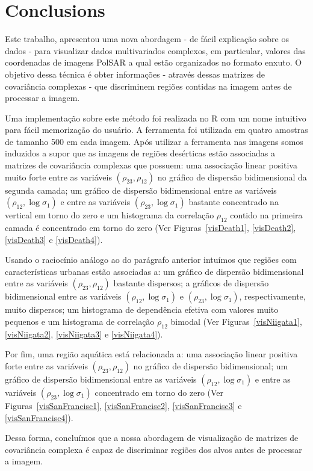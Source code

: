 \documentclass[a4paper,12pt]{article}
\begin{document}

\section{Conclusions}\label{cinco}


Este trabalho, apresentou uma nova abordagem - de fácil explicação sobre os dados - para visualizar dados multivariados complexos, em particular, valores das coordenadas de imagens Pol{SAR} a qual estão organizados no formato enxuto. O objetivo dessa técnica é obter informações - através dessas matrizes de covariância complexas - que discriminem regiões contidas na imagem antes de processar a imagem. 

Uma implementação sobre este método foi realizada no R com um nome intuitivo para fácil memorização do usuário. A ferramenta foi utilizada em quatro amostras de tamanho 500 em cada imagem. Após utilizar a ferramenta nas imagens somos induzidos a supor que as imagens de regiões desérticas estão associadas a matrizes de covariância complexas que possuem: uma associação linear positiva muito forte entre as variáveis $(\rho_{23}, \rho_{12})$ no gráfico de dispersão bidimensional da segunda camada;   um gráfico de dispersão bidimensional entre as variáveis $(\rho_{12},\log\sigma_{1})$ e entre as variáveis $(\rho_{23},\log\sigma_{1})$ bastante concentrado na vertical em torno do zero e um histograma da correlação $\rho_{12}$ contido na primeira camada é concentrado em torno do zero (Ver Figuras~\ref{visDeath1}, \ref{visDeath2}, \ref{visDeath3} e \ref{visDeath4}). 

Usando o raciocínio análogo ao do parágrafo anterior intuímos que regiões com características urbanas estão associadas a: um gráfico de dispersão bidimensional entre as variáveis $(\rho_{23}, \rho_{12})$ bastante dispersos; a gráficos de dispersão bidimensional entre as variáveis $(\rho_{12},\log\sigma_{1})$ e $(\rho_{23},\log\sigma_{1})$, respectivamente, muito dispersos; um histograma de dependência efetiva com valores muito pequenos e um histograma de correlação $\rho_{12}$ bimodal (Ver Figuras~\ref{visNiigata1}, \ref{visNiigata2}, \ref{visNiigata3} e \ref{visNiigata4}).   

Por fim, uma região aquática está relacionada a: uma associação linear positiva forte entre as variáveis $(\rho_{23}, \rho_{12})$ no gráfico de dispersão bidimensional; um gráfico de dispersão bidimensional entre as variáveis $(\rho_{12},\log\sigma_{1})$ e entre as variáveis $(\rho_{23},\log\sigma_{1})$ concentrado em torno do zero (Ver Figuras~\ref{visSanFrancisc1}, \ref{visSanFrancisc2}, \ref{visSanFrancisc3} e \ref{visSanFrancisc4}).

Dessa forma, concluímos que a nossa abordagem de visualização de matrizes de covariância complexa é capaz de discriminar regiões dos alvos antes de processar a imagem.

\newpage



\end{document}
